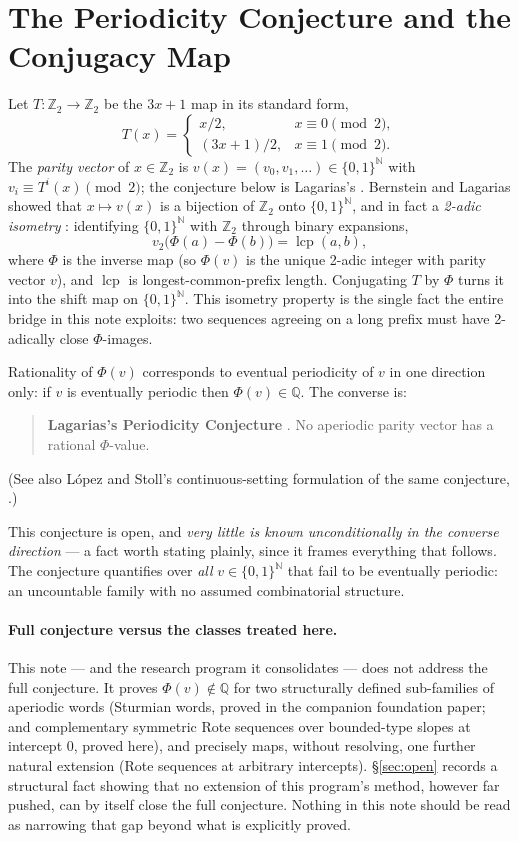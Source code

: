 \documentclass[11pt]{article}
\newcommand{\Q}{\mathbb{Q}}
\newcommand{\Z}{\mathbb{Z}}
\newcommand{\N}{\mathbb{N}}
\begin{document}
\section{The Periodicity Conjecture and the Conjugacy Map}
\label{sec:conjecture}

Let $T:\Z_2\to\Z_2$ be the $3x+1$ map in its standard form,
\[
T(x)=\begin{cases} x/2, & x\equiv 0 \pmod 2,\\ (3x+1)/2, & x\equiv 1\pmod 2.\end{cases}
\]
The \emph{parity vector} of $x\in\Z_2$ is $v(x)=(v_0,v_1,\dots)\in\{0,1\}^\N$ with $v_i\equiv T^i(x)\pmod 2$; the conjecture below is Lagarias's \cite{Lagarias1985}. Bernstein and Lagarias showed that $x\mapsto v(x)$ is a bijection of $\Z_2$ onto $\{0,1\}^\N$, and in fact a \emph{2-adic isometry} \cite{BernsteinLagarias1996,Bernstein1994}: identifying $\{0,1\}^\N$ with $\Z_2$ through binary expansions,
\[
v_2\bigl(\Phi(a)-\Phi(b)\bigr) = \operatorname{lcp}(a,b),
\]
where $\Phi$ is the inverse map (so $\Phi(v)$ is the unique 2-adic integer with parity vector $v$), and $\operatorname{lcp}$ is longest-common-prefix length. Conjugating $T$ by $\Phi$ turns it into the shift map on $\{0,1\}^\N$. This isometry property is the single fact the entire bridge in this note exploits: two sequences agreeing on a long prefix must have 2-adically close $\Phi$-images.

Rationality of $\Phi(v)$ corresponds to eventual periodicity of $v$ in one direction only: if $v$ is eventually periodic then $\Phi(v)\in\Q$. The converse is:

\begin{quote}
\textbf{Lagarias's Periodicity Conjecture} \cite[\S2]{Lagarias1985}. No aperiodic parity vector has a rational $\Phi$-value.
\end{quote}
(See also López and Stoll's continuous-setting formulation of the same conjecture, \cite{LopezStoll2021}.)

This conjecture is open, and \emph{very little is known unconditionally in the converse direction} --- a fact worth stating plainly, since it frames everything that follows. The conjecture quantifies over \emph{all} $v\in\{0,1\}^\N$ that fail to be eventually periodic: an uncountable family with no assumed combinatorial structure.

\paragraph{Full conjecture versus the classes treated here.} This note --- and the research program it consolidates --- does not address the full conjecture. It proves $\Phi(v)\notin\Q$ for two structurally defined sub-families of aperiodic words (Sturmian words, proved in the companion foundation paper; and complementary symmetric Rote sequences over bounded-type slopes at intercept $0$, proved here), and precisely maps, without resolving, one further natural extension (Rote sequences at arbitrary intercepts). \S\ref{sec:open} records a structural fact showing that no extension of this program's method, however far pushed, can by itself close the full conjecture. Nothing in this note should be read as narrowing that gap beyond what is explicitly proved.
\end{document}
